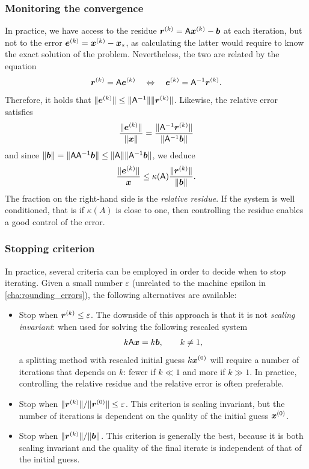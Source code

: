 \subsubsection{Monitoring the convergence}
\label{ssub:monitoring_the_convergence}
In practice,
we have access to the residue $\mathbf{\boldsymbol{r}}^{(k)} = \mathsf A \mathbf{\boldsymbol{x}}^{(k)} - \mathbf{\boldsymbol{b}}$ at each iteration,
but not to the error $\mathbf{\boldsymbol{e}}^{(k)} = \mathbf{\boldsymbol{x}}^{(k)} - \mathbf{\boldsymbol{x}}_*$,
as calculating the latter would require to know the exact solution of the problem.
Nevertheless,
the two are related by the equation
\[
    \mathbf{\boldsymbol{r}}^{(k)} = \mathsf A \mathbf{\boldsymbol{e}}^{(k)}
    \quad \Leftrightarrow \quad \mathbf{\boldsymbol{e}}^{(k)} = \mathsf A^{-1} \mathbf{\boldsymbol{r}}^{(k)}.
\]
Therefore, it holds that $\lVert\mathbf{\boldsymbol{e}}^{(k)}\rVert \leq \lVert\mathsf A^{-1}\rVert \lVert\mathbf{\boldsymbol{r}}^{(k)}\rVert$.
Likewise, the relative error satisfies
\[
     \frac{\lVert\mathbf{\boldsymbol{e}}^{(k)}\rVert}{\lVert\mathbf{\boldsymbol{x}}\rVert}
     = \frac{\lVert\mathsf A^{-1} \mathbf{\boldsymbol{r}}^{(k)}\rVert}{\lVert\mathsf A^{-1} \mathbf{\boldsymbol{b}}\rVert}
\]
and since $\lVert\mathbf{\boldsymbol{b}}\rVert = \lVert\mathsf A \mathsf A^{-1} \mathbf{\boldsymbol{b}}\rVert \leq \lVert\mathsf A\rVert \lVert\mathsf A^{-1} \mathbf{\boldsymbol{b}}\rVert$,
we deduce
\[
     \frac{\lVert\mathbf{\boldsymbol{e}}^{(k)}\rVert}{\mathbf{\boldsymbol{x}}}
     \leq \kappa(\mathsf A) \frac{\lVert\mathbf{\boldsymbol{r}}^{(k)}\rVert}{\lVert\mathbf{\boldsymbol{b}}\rVert}.
\]
The fraction on the right-hand side is the \emph{relative residue}.
If the system is well conditioned,
that is if $\kappa(A)$ is close to one,
then controlling the residue enables a good control of the error.

\subsubsection{Stopping criterion}%
\label{ssub:stopping_criterion}

In practice,
several criteria can be employed in order to decide when to stop iterating.
Given a small number $\varepsilon$ (unrelated to the machine epsilon in \cref{cha:rounding_errors}),
the following alternatives are available:
\begin{itemize}
    \item
        Stop when $\mathbf{\boldsymbol{r}}^{(k)} \leq \varepsilon$.
        The downside of this approach is that
        it is not \emph{scaling invariant}:
        when used for solving the following rescaled system
        \[
            k \mathsf A \mathbf{\boldsymbol{x}} = k \mathbf{\boldsymbol{b}}, \qquad k \neq 1,
        \]
        a splitting method with rescaled initial guess $k \mathbf{\boldsymbol{x}}^{(0)}$
        will require a number of iterations that depends on $k$:
        fewer if $k \ll 1$ and more if $k \gg 1$.
        In practice, controlling the relative residue and the relative error is often preferable.

    \item
        Stop when $\lVert\mathbf{\boldsymbol{r}}^{(k)}\rVert / \lVert\mathbf{\boldsymbol{r}}^{(0)}\rVert \leq \varepsilon$.
        This criterion is scaling invariant,
        but the number of iterations is dependent on the quality of the initial guess $\mathbf{\boldsymbol{x}}^{(0)}$.

    \item
        Stop when $\lVert\mathbf{\boldsymbol{r}}^{(k)}\rVert / \lVert\mathbf{\boldsymbol{b}}\rVert$.
        This criterion is generally the best,
        because it is both scaling invariant and the quality of the final iterate is independent of that of the initial guess.
\end{itemize}

